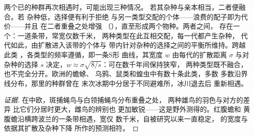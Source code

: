 \begin{proposition}[强化与杂交带]\label{prop:b2:speciation:reinforcement}
两个已的种群再次相遇时，可能出现三种情况。
若其杂种与亲本相当，二者便融合。若
杂种低，选择便有利于拒绝
与另一类型交配的个体——浪费的配子即为代价——并且
在二者重叠之处增强
（\emph{}），直至形成两个物种。两者之间，
存在一个\emph{}：一道条带，常宽仅数千米，
两种类型在此互相交配，每一代都产生杂种，
代代如此，由扩散进入该带的个体与
带内针对杂种的选择之间的平衡所维持。跨越此类
，各类型的频率遵循\emph{}，即一条S形
曲线，其宽度 $w$ 由每代的扩散距离 $\sigma$
与对杂种的选择 $s$ 决定，$w \approx
\sigma\sqrt{8/s}$：可在数千年间保持狭窄，
两种类型既不融合，也不完全分开。欧洲的蟾蜍、
乌鸦、鼠类和蝗虫中有数十条此类，多数
多数沿界线分布，那里的种群曾在
末次冰期中分居于不同避难所，冰川退去后
重新相遇。
\end{proposition}
\begin{proof}[证据]
在中欧，斑捕蝇鸟与白领捕蝇鸟分布重叠之处，
两种雄鸟的羽色与对方的差异
比它们分居时更大，雌鸟的辨别也
更加敏锐——这是野外测得的。红腹蟾和
黄腹蟾沿横跨波兰的一条带相遇，宽仅
数千米，自被研究以来一直稳定，
的宽度与依据其扩散及杂种下降
所作的预测相符。
\end{proof}

